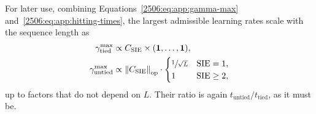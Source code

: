 For later use, combining Equations~\eqref{2506:eq:app:gamma-max} and~\eqref{2506:eq:app:hitting-times}, the largest admissible learning rates scale with the sequence length as
\begin{equation} \label{2506:eq:app:gamma-max-scalings}
    \begin{aligned}
        \gamma_\mathrm{tied}^\mathrm{max} &\propto C_\mathrm{SIE} \times ({\boldsymbol{1}},\dots,{\boldsymbol{1}}),\\
        \gamma_\mathrm{untied}^\mathrm{max} &\propto \left\lVert C_\mathrm{SIE}\right\rVert_\mathrm{op}\cdot\begin{cases}
            \sfrac{1}{\sqrt{L}} & \mathrm{SIE} = 1,\\
            1 & \mathrm{SIE} \ge 2,
        \end{cases}
    \end{aligned}
\end{equation}
up to factors that do not depend on \(L\). Their ratio is again \(t_\mathrm{untied}/t_\mathrm{tied}\), as it must be.

